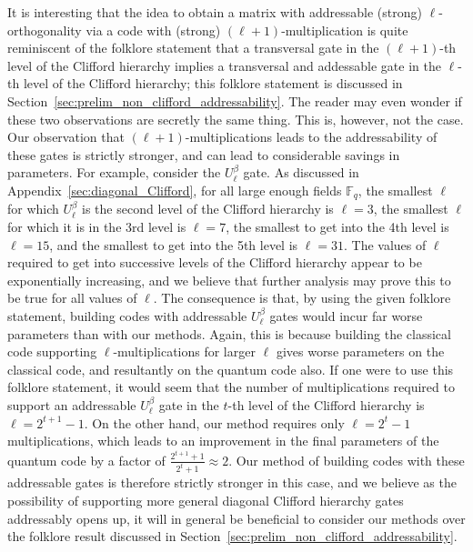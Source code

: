\documentclass[11pt]{article}
\theoremstyle{definition}
\begin{document}
It is interesting that the idea to obtain a matrix with addressable (strong) $\ell$-orthogonality via a code with (strong) $(\ell+1)$-multiplication is quite reminiscent of the folklore statement that a transversal gate in the $(\ell+1)$-th level of the Clifford hierarchy implies a transversal and addessable gate in the $\ell$-th level of the Clifford hierarchy; this folklore statement is discussed in Section~\ref{sec:prelim_non_clifford_addressability}. The reader may even wonder if these two observations are secretly the same thing. This is, however, not the case. Our observation that $(\ell+1)$-multiplications leads to the addressability of these gates is strictly stronger, and can lead to considerable savings in parameters. For example, consider the $U_\ell^\beta$ gate. As discussed in Appendix~\ref{sec:diagonal_Clifford}, for all large enough fields $\mathbb{F}_q$, the smallest $\ell$ for which $U_\ell^\beta$ is the second level of the Clifford hierarchy is $\ell = 3$, the smallest $\ell$ for which it is in the 3rd level is $\ell = 7$, the smallest to get into the 4th level is $\ell = 15$, and the smallest to get into the 5th level is $\ell = 31$. The values of $\ell$ required to get into successive levels of the Clifford hierarchy appear to be exponentially increasing, and we believe that further analysis may prove this to be true for all values of $\ell$. The consequence is that, by using the given folklore statement, building codes with addressable $U_\ell^\beta$ gates would incur far worse parameters than with our methods. Again, this is because building the classical code supporting $\ell$-multiplications for larger $\ell$ gives worse parameters on the classical code, and resultantly on the quantum code also. If one were to use this folklore statement, it would seem that the number of multiplications required to support an addressable $U_\ell^\beta$ gate in the $t$-th level of the Clifford hierarchy is $\ell = 2^{t+1}-1$. On the other hand, our method requires only $\ell=2^t-1$ multiplications, which leads to an improvement in the final parameters of the quantum code by a factor of $\frac{2^{t+1}+1}{2^t+1} \approx 2$. Our method of building codes with these addressable gates is therefore strictly stronger in this case, and we believe as the possibility of supporting more general diagonal Clifford hierarchy gates addressably opens up, it will in general be beneficial to consider our methods over the folklore result discussed in Section~\ref{sec:prelim_non_clifford_addressability}.
\end{document}
